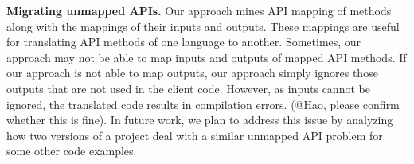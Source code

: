 \textbf{Migrating unmapped APIs.} Our approach mines API mapping of
methods along with the mappings of their inputs and outputs.
These mappings are useful for translating API methods of one language to another.
Sometimes, our approach may not be able to map inputs and outputs
of mapped API methods. If our approach is not able to map outputs,
our approach simply ignores those outputs that are not used in the client code.
However, as inputs cannot be ignored, the translated code results in compilation errors.
(@Hao, please confirm whether this is fine). In future work, we plan to address
this issue by analyzing how two versions of a project deal
with a similar unmapped API problem for some other code examples.
